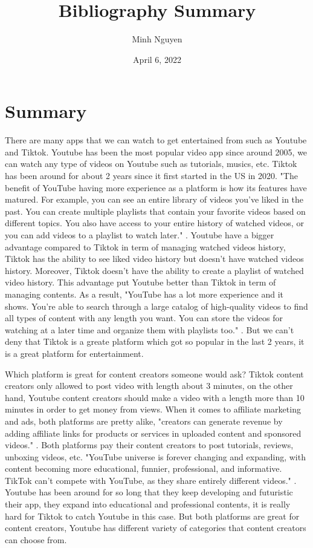 \documentclass{article}
\title{Bibliography Summary}
\author{Minh Nguyen}
\date{April 6, 2022}
\begin{document}
\maketitle

\section*{Summary}
There are many apps that we can watch to get entertained from such as Youtube and Tiktok. Youtube has been the most popular video app since around 2005, we can watch any type of videos on Youtube such as tutorials, musics, etc. Tiktok has been around for about 2 years since it first started in the US in 2020. "The benefit of YouTube having more experience as a platform is how its features have matured. For example, you can see an entire library of videos you've liked in the past. You can create multiple playlists that contain your favorite videos based on different topics. You also have access to your entire history of watched videos, or you can add videos to a playlist to watch later." \cite{Raul21}. Youtube have a bigger advantage compared to Tiktok in term of managing watched videos history, Tiktok has the ability to see liked video history but doesn't have watched videos history. Moreover, Tiktok doesn't have the ability to create a playlist of watched video history. This advantage put Youtube better than Tiktok in term of managing contents. As a result, "YouTube has a lot more experience and it shows. You're able to search through a large catalog of high-quality videos to find all types of content with any length you want. You can store the videos for watching at a later time and organize them with playlists too." \cite{Raul21}. But we can't deny that Tiktok is a greate platform which got so popular in the last 2 years, it is a great platform for entertainment.

\medskip

Which platform is great for content creators someone would ask? Tiktok content creators only allowed to post video with length about 3 minutes, on the other hand, Youtube content creators should make a video with a length more than 10 minutes in order to get money from views. When it comes to affiliate marketing and ads, both platforms are pretty alike, "creators can generate revenue by adding affiliate links for products or services in uploaded content and sponsored videos." \cite{Christie21}. Both platforms pay their content creators to post tutorials, reviews, unboxing videos, etc. "YouTube universe is forever changing and expanding, with content becoming more educational, funnier, professional, and informative. TikTok can’t compete with YouTube, as they share entirely different videos." \cite{Christie21}. Youtube has been around for so long that they keep developing and futuristic their app, they expand into educational and professional contents, it is really hard for Tiktok to catch Youtube in this case. But both platforms are great for content creators, Youtube has different variety of categories that content creators can choose from.




\printbibliography
\end{document}
